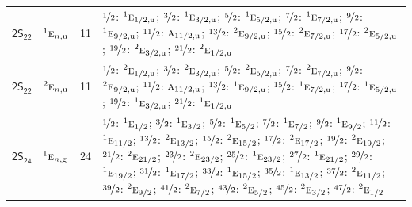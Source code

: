 \documentclass[10pt,a4paper]{article}
\numberwithin{equation}{section}
\newcommand{\grp}[1]{\mathsf{#1}}
\newcommand{\irr}[1]{\text{\normalfont\scshape #1}}
\newcommand{\conjpair}[1]{{}^{#1}}
\newcommand{\ptag}[1]{\mathrm{#1}}
\newlength{\fillwidth}\newlength{\cellwidth}\newlength{\colwidth}
\begin{document}
{\begin{longtable}{@{}llr>{\RaggedRight\arraybackslash}p{\fillwidth}@{}}
\href{2S22.pdf}{$\grp{2S_{22}}$} & $\conjpair{1}\irr{e}_{n,\ptag{u}}$ & 11 & $\nicefrac{1}{2}$: $\conjpair{1}\irr{e}_{1/2,\ptag{u}}$; $\nicefrac{3}{2}$: $\conjpair{1}\irr{e}_{3/2,\ptag{u}}$; $\nicefrac{5}{2}$: $\conjpair{1}\irr{e}_{5/2,\ptag{u}}$; $\nicefrac{7}{2}$: $\conjpair{1}\irr{e}_{7/2,\ptag{u}}$; $\nicefrac{9}{2}$: $\conjpair{1}\irr{e}_{9/2,\ptag{u}}$; $\nicefrac{11}{2}$: $\irr{a}_{11/2,\ptag{u}}$; $\nicefrac{13}{2}$: $\conjpair{2}\irr{e}_{9/2,\ptag{u}}$; $\nicefrac{15}{2}$: $\conjpair{2}\irr{e}_{7/2,\ptag{u}}$; $\nicefrac{17}{2}$: $\conjpair{2}\irr{e}_{5/2,\ptag{u}}$; $\nicefrac{19}{2}$: $\conjpair{2}\irr{e}_{3/2,\ptag{u}}$; $\nicefrac{21}{2}$: $\conjpair{2}\irr{e}_{1/2,\ptag{u}}$\\
\href{2S22.pdf}{$\grp{2S_{22}}$} & $\conjpair{2}\irr{e}_{n,\ptag{u}}$ & 11 & $\nicefrac{1}{2}$: $\conjpair{2}\irr{e}_{1/2,\ptag{u}}$; $\nicefrac{3}{2}$: $\conjpair{2}\irr{e}_{3/2,\ptag{u}}$; $\nicefrac{5}{2}$: $\conjpair{2}\irr{e}_{5/2,\ptag{u}}$; $\nicefrac{7}{2}$: $\conjpair{2}\irr{e}_{7/2,\ptag{u}}$; $\nicefrac{9}{2}$: $\conjpair{2}\irr{e}_{9/2,\ptag{u}}$; $\nicefrac{11}{2}$: $\irr{a}_{11/2,\ptag{u}}$; $\nicefrac{13}{2}$: $\conjpair{1}\irr{e}_{9/2,\ptag{u}}$; $\nicefrac{15}{2}$: $\conjpair{1}\irr{e}_{7/2,\ptag{u}}$; $\nicefrac{17}{2}$: $\conjpair{1}\irr{e}_{5/2,\ptag{u}}$; $\nicefrac{19}{2}$: $\conjpair{1}\irr{e}_{3/2,\ptag{u}}$; $\nicefrac{21}{2}$: $\conjpair{1}\irr{e}_{1/2,\ptag{u}}$\\
\href{2S24.pdf}{$\grp{2S_{24}}$} & $\conjpair{1}\irr{e}_{n,\ptag{g}}$ & 24 & $\nicefrac{1}{2}$: $\conjpair{1}\irr{e}_{1/2}$; $\nicefrac{3}{2}$: $\conjpair{1}\irr{e}_{3/2}$; $\nicefrac{5}{2}$: $\conjpair{1}\irr{e}_{5/2}$; $\nicefrac{7}{2}$: $\conjpair{1}\irr{e}_{7/2}$; $\nicefrac{9}{2}$: $\conjpair{1}\irr{e}_{9/2}$; $\nicefrac{11}{2}$: $\conjpair{1}\irr{e}_{11/2}$; $\nicefrac{13}{2}$: $\conjpair{2}\irr{e}_{13/2}$; $\nicefrac{15}{2}$: $\conjpair{2}\irr{e}_{15/2}$; $\nicefrac{17}{2}$: $\conjpair{2}\irr{e}_{17/2}$; $\nicefrac{19}{2}$: $\conjpair{2}\irr{e}_{19/2}$; $\nicefrac{21}{2}$: $\conjpair{2}\irr{e}_{21/2}$; $\nicefrac{23}{2}$: $\conjpair{2}\irr{e}_{23/2}$; $\nicefrac{25}{2}$: $\conjpair{1}\irr{e}_{23/2}$; $\nicefrac{27}{2}$: $\conjpair{1}\irr{e}_{21/2}$; $\nicefrac{29}{2}$: $\conjpair{1}\irr{e}_{19/2}$; $\nicefrac{31}{2}$: $\conjpair{1}\irr{e}_{17/2}$; $\nicefrac{33}{2}$: $\conjpair{1}\irr{e}_{15/2}$; $\nicefrac{35}{2}$: $\conjpair{1}\irr{e}_{13/2}$; $\nicefrac{37}{2}$: $\conjpair{2}\irr{e}_{11/2}$; $\nicefrac{39}{2}$: $\conjpair{2}\irr{e}_{9/2}$; $\nicefrac{41}{2}$: $\conjpair{2}\irr{e}_{7/2}$; $\nicefrac{43}{2}$: $\conjpair{2}\irr{e}_{5/2}$; $\nicefrac{45}{2}$: $\conjpair{2}\irr{e}_{3/2}$; $\nicefrac{47}{2}$: $\conjpair{2}\irr{e}_{1/2}$\\

\end{longtable}}
\end{document}
